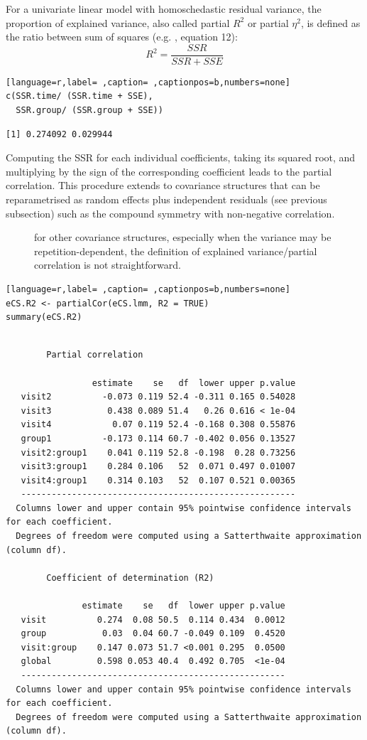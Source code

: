 \documentclass[12pt]{article}
\newcommand\Warning[1][3ex]{%
\renewcommand\stacktype{L}%
\scaleto{\stackon[1.3pt]{\color{red}$\triangle$}{\tiny\bfseries !}}{#1}%
\xspace
}
\begin{document}
For a univariate linear model with homoschedastic residual variance,
the proportion of explained variance, also called partial \(R^2\) or
partial \(\eta^2\), is defined as the ratio between sum of squares
(e.g. \cite{lakens2013calculating}, equation 12):
\[ R^2=\frac{SSR}{SSR + SSE} \]

\begin{lstlisting}[language=r,label= ,caption= ,captionpos=b,numbers=none]
c(SSR.time/ (SSR.time + SSE),
  SSR.group/ (SSR.group + SSE))
\end{lstlisting}

\begin{verbatim}
[1] 0.274092 0.029944
\end{verbatim}


Computing the SSR for each individual coefficients, taking its squared
root, and multiplying by the sign of the corresponding coefficient
leads to the partial correlation. This procedure extends to covariance
structures that can be reparametrised as random effects plus
independent residuals (see previous subsection) such as the compound
symmetry with non-negative correlation.
\begin{description}
\item[{\Warning}] for other covariance structures, especially when the
variance may be repetition-dependent, the definition of explained
variance/partial correlation is not straightforward.
\end{description}
\begin{lstlisting}[language=r,label= ,caption= ,captionpos=b,numbers=none]
eCS.R2 <- partialCor(eCS.lmm, R2 = TRUE)
summary(eCS.R2)
\end{lstlisting}

\begin{verbatim}

		Partial correlation 

                 estimate    se   df  lower upper p.value
   visit2          -0.073 0.119 52.4 -0.311 0.165 0.54028
   visit3           0.438 0.089 51.4   0.26 0.616 < 1e-04
   visit4            0.07 0.119 52.4 -0.168 0.308 0.55876
   group1          -0.173 0.114 60.7 -0.402 0.056 0.13527
   visit2:group1    0.041 0.119 52.8 -0.198  0.28 0.73256
   visit3:group1    0.284 0.106   52  0.071 0.497 0.01007
   visit4:group1    0.314 0.103   52  0.107 0.521 0.00365
   ------------------------------------------------------ 
  Columns lower and upper contain 95% pointwise confidence intervals for each coefficient.
  Degrees of freedom were computed using a Satterthwaite approximation (column df). 

		Coefficient of determination (R2)

               estimate    se   df  lower upper p.value
   visit          0.274  0.08 50.5  0.114 0.434  0.0012
   group           0.03  0.04 60.7 -0.049 0.109  0.4520
   visit:group    0.147 0.073 51.7 <0.001 0.295  0.0500
   global         0.598 0.053 40.4  0.492 0.705  <1e-04
   ---------------------------------------------------- 
  Columns lower and upper contain 95% pointwise confidence intervals for each coefficient.
  Degrees of freedom were computed using a Satterthwaite approximation (column df).
\end{verbatim}
\end{document}
